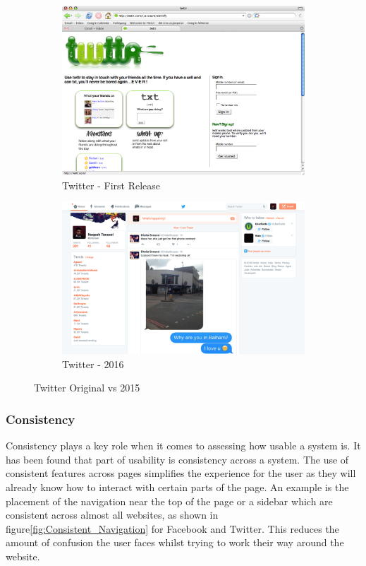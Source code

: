 \begin{figure}[H]
	\centering
	\begin{subfigure}[t]{0.45\textwidth}
		\centering
		\includegraphics[width=1.0\textwidth]{images/Twitter_Old}
		\caption{Twitter - First Release}\label{fig:Twitter_Old}		
	\end{subfigure}
	\quad
	\begin{subfigure}[t]{0.45\textwidth}
		\centering
		\includegraphics[width=1.0\textwidth]{images/Twitter_Flat}
		\caption{Twitter - 2016}\label{fig:Twitter_Flat}
	\end{subfigure}
	\caption{Twitter Original vs 2015}\label{fig:Twitter_Changes}
\end{figure}

\subsubsection{Consistency}
Consistency plays a key role when it comes to assessing how usable a system is. It has been found that part of usability is consistency across a system. The use of consistent features across pages simplifies the experience for the user as they will already know how to interact with certain parts of the page. An example is the placement of the navigation near the top of the page or a sidebar which are consistent across almost all websites, as shown in figure\ref{fig:Consistent_Navigation} for Facebook and Twitter. This reduces the amount of confusion the user faces whilst trying to work their way around the website.

